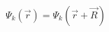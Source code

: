 \documentclass[preview]{standalone}
\begin{document}
\begin{align*}
\Psi_k(\vec{r})= \Psi_k(\vec{r}+\vec{R})
\end{align*}
\end{document}
